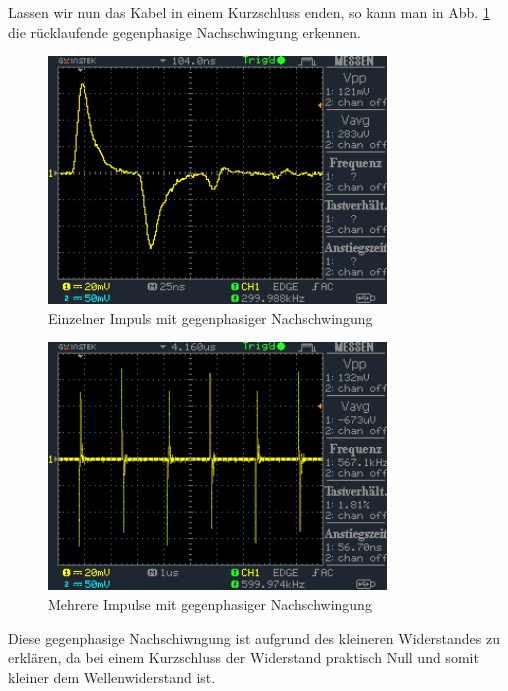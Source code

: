 \documentclass[a4paper,10pt]{article}
\numberwithin{equation}{section}
\begin{document}
Lassen wir nun das Kabel in einem Kurzschluss enden, so kann man in Abb. \ref{fig:3.6} die rücklaufende gegenphasige Nachschwingung erkennen.
\begin{figure}[h]
        \centering
        \includegraphics[width=0.8\textwidth]{data/DS0023.BMP.png}
        \caption{Einzelner Impuls mit gegenphasiger Nachschwingung}
		\label{fig:3.6}
\end{figure}
\begin{figure}[h]
        \centering
        \includegraphics[width=0.8\textwidth]{data/DS0022.BMP.png}
        \caption{Mehrere Impulse mit gegenphasiger Nachschwingung}
		\label{fig:3.7}
\end{figure}
Diese gegenphasige Nachschiwngung ist aufgrund des kleineren Widerstandes zu erklären, da bei einem Kurzschluss der Widerstand praktisch Null und somit kleiner dem Wellenwiderstand ist. 
\end{document}

